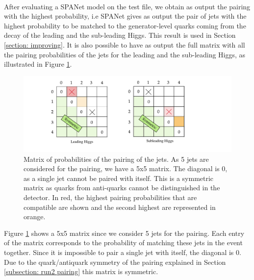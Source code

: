 \


After evaluating a SPANet model on the test file, we obtain as output the pairing with the highest probability, i.e SPANet gives as output the pair of jets with the highest probability to be matched to the generator-level quarks coming from the decay of the leading and the sub-leading Higgs. This result is used in Section \ref{section: improving}. It is also possible to have as output the full matrix with all the pairing probabilities of the jets for the leading and the sub-leading Higgs, as illustrated in Figure \ref{fig: probabilities matrix}.


\begin{figure}[hbt]
    \centering
    \includegraphics[width=0.8\linewidth]{Images/7.S:B/Prob diff/probability difference.pdf}
    \caption{Matrix of probabilities of the pairing of the jets. As 5 jets are considered for the pairing, we have a 5x5 matrix. The diagonal is 0, as a single jet cannot be paired with itself. This is a symmetric matrix as quarks from anti-quarks cannot be distinguished in the detector. In red, the highest pairing probabilities that are compatible are shown and the second highest are represented in orange.}
    \label{fig: probabilities matrix}
\end{figure}

Figure \ref{fig: probabilities matrix} shows a 5x5 matrix since we consider 5 jets for the pairing. Each entry of the matrix corresponds to the probability of matching these jets in the event together. Since it is impossible to pair a single jet with itself, the diagonal is 0. Due to the quark/antiquark symmetry of the pairing explained in Section \ref{subsection: run2 pairing} this matrix is symmetric.

